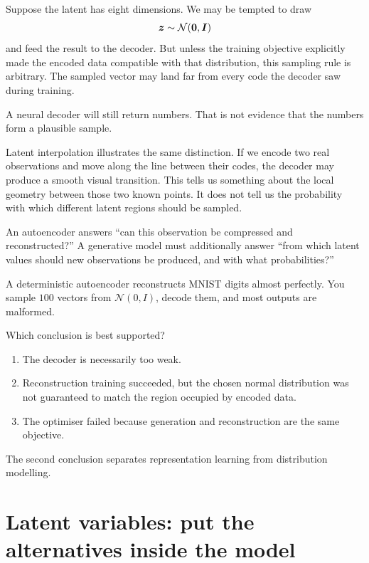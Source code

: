Suppose the latent has eight dimensions. We may be tempted to draw
\[
  \bm{z}\sim\mathcal{N}(\bm{0},\bm{I})
\]
and feed the result to the decoder. But unless the training objective explicitly made the encoded data compatible with that distribution, this sampling rule is arbitrary. The sampled vector may land far from every code the decoder saw during training.

A neural decoder will still return numbers. That is not evidence that the numbers form a plausible sample.

Latent interpolation illustrates the same distinction. If we encode two real observations and move along the line between their codes, the decoder may produce a smooth visual transition. This tells us something about the local geometry between those two known points. It does not tell us the probability with which different latent regions should be sampled.

\begin{keyidea}
An autoencoder answers ``can this observation be compressed and reconstructed?'' A generative model must additionally answer ``from which latent values should new observations be produced, and with what probabilities?''
\end{keyidea}

\begin{checkpointbox}
A deterministic autoencoder reconstructs MNIST digits almost perfectly. You sample \(100\) vectors from \(\mathcal{N}(0,I)\), decode them, and most outputs are malformed.

Which conclusion is best supported?
\begin{enumerate}[leftmargin=*]
  \item The decoder is necessarily too weak.
  \item Reconstruction training succeeded, but the chosen normal distribution was not guaranteed to match the region occupied by encoded data.
  \item The optimiser failed because generation and reconstruction are the same objective.
\end{enumerate}
The second conclusion separates representation learning from distribution modelling.
\end{checkpointbox}

\section{Latent variables: put the alternatives inside the model}


